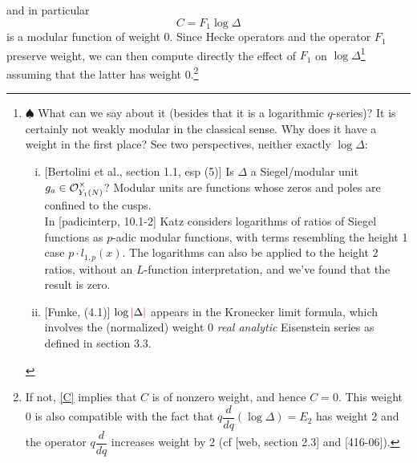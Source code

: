 \documentclass{rs}
\theoremstyle{definition}
\theoremstyle{remark}
\newcommand{\CO}{{\cal O}}
\renewcommand{\D}{\Delta}
\newcommand{\todo}{\spadesuit}
\renewcommand{\=}{\approx}
\renewcommand{\-}{\sim}
\newcommand{\rd}[1]{\textcolor{red}{#1}}
\numberwithin{equation}{section}
\numberwithin{thm}{section}
\begin{document}
and in particular 
\begin{equation}
 \label{C}
 C = F_1 \log \D 
\end{equation}
is a modular function of weight 0.  
Since Hecke operators and the operator $F_1$ preserve weight, 
we can then compute directly the effect of $F_1$ on $\log \D$\footnote{$\todo$ 
What can we say about it (besides that it is a logarithmic $q$-series)?  
It is certainly not weakly modular in the classical sense.  
Why does it have a weight in the first place?  
See two perspectives, neither exactly $\log \D$: 
\begin{enumerate}[(i)]
 \item \label{Siegel} {[Bertolini et al., section 1.1, esp (5)]} \quad
 Is $\D$ a Siegel/modular unit $g_a \in \CO_{Y_1(N)}^\times$?  
 Modular units are functions whose zeros and poles are confined to the cusps.  \\
 In [padicinterp, 10.1-2] Katz considers logarithms of ratios of Siegel functions as $p$-adic modular functions, 
 with terms resembling the height 1 case $p \cdot l_{1,p}(x)$.  
 The logarithms can also be applied to the height 2 ratios, without an $L$-function interpretation, 
 and we've found that the result is zero.  
 \item {[Funke, (4.1)]} \quad
 $\log \rd{|}\D\rd{|}$ appears in the Kronecker limit formula, 
 which involves the (normalized) weight 0 {\em real analytic} Eisenstein series as defined in section 3.3.  
\end{enumerate}
} 
assuming that the latter has weight 0.\footnote{If not, 
\eqref{C} implies that $C$ is of nonzero weight, and hence $C = 0$.  
This weight 0 is also compatible with the fact that $q \dfrac{d}{dq} (\log \D) = E_2$ has weight 2 
and the operator $q \dfrac{d}{dq}$ increases weight by 2 (cf [web, section 2.3] and [416-06]).  }  
\end{document}
